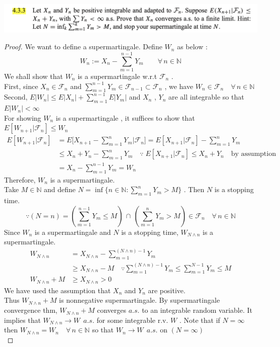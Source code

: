 \documentclass[12pt, A4]{article}
\newcommand{\N}{\mathbb{N}}
\newcommand{\F}{\mathcal{F}}
\newcommand{\intersect}{\,\cap\,}
\newcommand{\foranyn}{\quad \forall \, n\in \N}
\begin{document}
\includegraphics[width=17cm]{Exer4.3.3.png}
\begin{proof}
    We want to define a supermartingale. Define $W_n$ as below :
    $$
        W_n := X_n-\sum_{m=1}^{n-1} Y_m \quad \foranyn
    $$
    We shall show that $W_n$ is a supermartingale w.r.t $\F_n$ .\\ First, since $X_n\in \F_n$ and $\sum_{m=1}^{n-1}Y_m\in \F_{n-1}\subset \F_n$ , we have $W_n\in \F_n\foranyn$ \\ Second, $E|W_n|\leq E|X_n|+\sum_{m=1}^{n-1}E|Y_m|$ and $X_n$ , $Y_n$ are all integrable so that $E|W_n|<\infty$ \\
    For showing $W_n$ is a supermartingale , it suffices to show that $E[W_{n+1}|\F_n]\leq W_n$
    \begin{align*}
        E[W_{n+1}|\F_n] &= E\Big[X_{n+1}-\sum_{m=1}^n Y_m \big|\F_n\Big] = E[X_{n+1}|\F_n]-\sum_{m=1}^n Y_m \\ &\leq X_n+Y_n - \sum_{m=1}^n Y_m \quad \because \; E[X_{n+1}|\F_n]\leq X_n+Y_n \quad \text{by assumption} \\ &= X_n -\sum_{m=1}^{n-1}Y_m = W_n
    \end{align*}
    Therefore, $W_n$ is a supermartingale. \\ Take $M\in \N$ and define $N=\inf\{n\in \N : \sum_{m=1}^n Y_m>M\}$ . Then $N$ is a stopping time. 
    $$ \because (N=n)= (\sum_{m=1}^{n-1}Y_m \leq M)\intersect (\sum_{m=1}^n Y_m >M) \in \F_n \foranyn$$
    Since $W_n$ is a supermartingale and $N$ is a stopping time, $W_{N\wedge n}$ is a supermartingale. \\
    \begin{align*}
        W_{N\wedge n } &=X_{N\wedge n} - \sum_{m=1}^{(N\wedge n) -1}Y_m \\ 
        &\geq X_{N\wedge n}-M \quad \because \sum_{m=1}^{(N\wedge n)-1} Y_m \leq \sum_{m=1}^{N-1}Y_m\leq M \\
        W_{N\wedge n}+M &\geq X_{N\wedge n}>0
    \end{align*}
    We have used the assumption that $X_n$ and $Y_n$ are positive.\\ Thus $W_{N\wedge n}+M$ is nonnegative supermartingale. By supermartingale convergence thm, $W_{N\wedge n}+M$ converges $a.s.$ to an integrable random variable. It implies that $W_{N\wedge n}\rightarrow W\;\,a.s.$ for some integrable r.v. $W$ . Note that if $N=\infty$ then $W_{N\wedge n}=W_n\foranyn$ so that $W_n\rightarrow W\;\,a.s.$ on $(N=\infty)$ \\

\end{proof}
\end{document}
